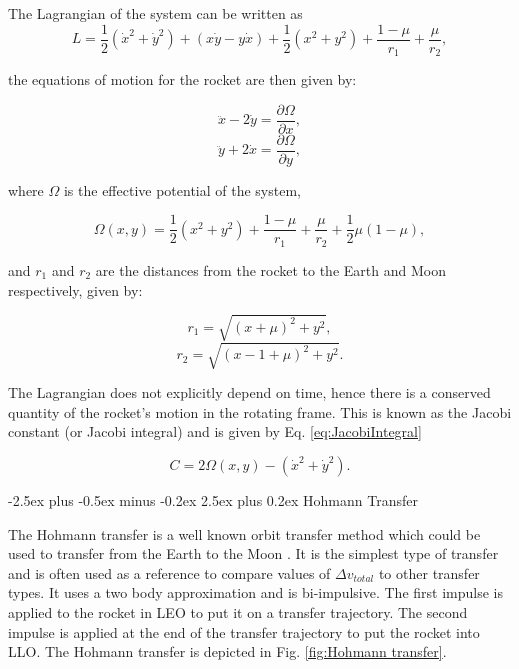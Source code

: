 \documentclass[10pt,twocolumn]{revtex4-2}    %
\makeatletter
\renewcommand{\subsection}{\@startsection{subsection}{2}{\z@}%
  {-2.5ex plus -0.5ex minus -0.2ex}%
  {2.5ex plus 0.2ex}%
  {\normalfont\normalsize\bfseries}}
\makeatother
\begin{document}
The Lagrangian of the system can be written as
\begin{equation}
    L = \frac{1}{2}(\dot{x}^2 + \dot{y}^2) + (x\dot{y} - y\dot{x}) + \frac{1}{2}(x^2+y^2) + \frac{1-\mu}{r_1} + \frac{\mu}{r_2},
\end{equation}

the equations of motion for the rocket are then given by:

\begin{equation}
    \ddot{x} - 2\dot{y} = \frac{\partial \Omega}{\partial x},
    \label{eq:EOM1}
\end{equation}
\begin{equation}
    \ddot{y} + 2\dot{x} = \frac{\partial \Omega}{\partial y},
    \label{eq:EOM2}
\end{equation}

where $\Omega$ is the effective potential of the system,

\begin{equation}
    \Omega(x, y) = \frac{1}{2}(x^2 + y^2) + \frac{1-\mu}{r_1} + \frac{\mu}{r_2} + \frac{1}{2}\mu(1-\mu),
\end{equation}

and $r_1$ and $r_2$ are the distances from the rocket to the Earth and Moon respectively, given by:

\begin{equation}
    r_1 = \sqrt{(x + \mu)^2 + y^2},
\end{equation}
\begin{equation}
    r_2 = \sqrt{(x - 1 + \mu)^2 + y^2}.
\end{equation}

The Lagrangian does not explicitly depend on time, hence there is a conserved quantity of the rocket's motion in the rotating frame. This is known as the Jacobi constant (or Jacobi integral) and is given by Eq. \ref{eq:JacobiIntegral}

\begin{equation}
    C = 2\Omega(x, y) - (\dot{x}^2 + \dot{y}^2).
    \label{eq:JacobiIntegral}
\end{equation}

\subsection{Hohmann Transfer}
\label{sec:Hohmann Transfer}

The Hohmann transfer is a well known orbit transfer method which could be used to transfer from the Earth to the Moon \cite{Hohmann1925}. It is the simplest type of transfer and is often used as a reference to compare values of $\Delta v_{total}$ to other transfer types. It uses a two body approximation and is bi-impulsive. The first impulse is applied to the rocket in LEO to put it on a transfer trajectory. The second impulse is applied at the end of the transfer trajectory to put the rocket into LLO. The Hohmann transfer is depicted in Fig. \ref{fig:Hohmann transfer}.
\end{document}
